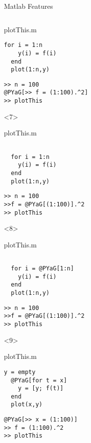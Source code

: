 \begin{frame}[fragile]{Matlab Features}
\begin{columns}
\begin{column}{5cm}
\begin{onlyenv}
\begin{block}{plotThis.m}
\begin{Verbatim}[commandchars=@\[\]]
  for i = 1:n
    y(i) = f(i)
  end
  plot(1:n,y)
          \end{Verbatim}
        \end{block}
          \begin{Verbatim}[commandchars=@\[\]]
>> n = 100
@PYaG[>> f = (1:100).^2]
>> plotThis
        \end{Verbatim}
      \end{onlyenv}
      \begin{onlyenv}<7>
        \begin{block}{plotThis.m}
          \begin{Verbatim}[commandchars=@\[\]]

  for i = 1:n
    y(i) = f(i)
  end
  plot(1:n,y)
          \end{Verbatim}
        \end{block}
          \begin{Verbatim}[commandchars=@\[\]]
>> n = 100
>>f = @PYaG[(1:100)].^2
>> plotThis
        \end{Verbatim}
      \end{onlyenv}
      \begin{onlyenv}<8>
        \begin{block}{plotThis.m}
          \begin{Verbatim}[commandchars=@\[\]]

  for i = @PYaG[1:n]
    y(i) = f(i)
  end
  plot(1:n,y)
          \end{Verbatim}
        \end{block}
          \begin{Verbatim}[commandchars=@\[\]]
>> n = 100
>>f = @PYaG[(1:100)].^2
>> plotThis
        \end{Verbatim}
      \end{onlyenv}
      \begin{onlyenv}<9>
        \begin{block}{plotThis.m}
          \begin{Verbatim}[commandchars=@\[\]]
  y = empty
  @PYaG[for t = x]
    y = [y; f(t)]
  end
  plot(x,y)
          \end{Verbatim}
        \end{block}
          \begin{Verbatim}[commandchars=@\[\]]
@PYaG[>> x = (1:100)]
>> f = (1:100).^2
>> plotThis
        \end{Verbatim}
      \end{onlyenv}


\end{column}
\end{columns}
\end{frame}
